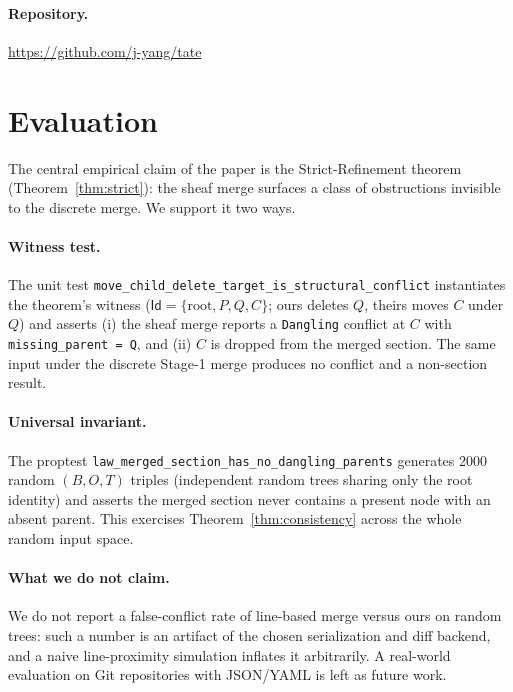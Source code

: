 \documentclass[11pt,a4paper]{article}
\newcommand{\Id}{\mathsf{Id}}
\begin{document}
\paragraph{Repository.} \url{https://github.com/j-yang/tate}


\section{Evaluation}
\label{sec:eval}

The central empirical claim of the paper is the Strict-Refinement theorem
(Theorem~\ref{thm:strict}): the sheaf merge surfaces a class of
obstructions invisible to the discrete merge. We support it two ways.

\paragraph{Witness test.} The unit test
\texttt{move\_child\_delete\_target\_is\_structural\_conflict}
instantiates the theorem's witness ($\Id = \{\text{root}, P, Q, C\}$; ours
deletes $Q$, theirs moves $C$ under $Q$) and asserts (i) the sheaf merge
reports a \texttt{Dangling} conflict at $C$ with \texttt{missing\_parent = Q},
and (ii) $C$ is dropped from the merged section. The same input under the
discrete Stage-1 merge produces no conflict and a non-section result.

\paragraph{Universal invariant.} The proptest
\texttt{law\_merged\_section\_has\_no\_dangling\_parents} generates 2000
random $(B, O, T)$ triples (independent random trees sharing only the
root identity) and asserts the merged section never contains a present
node with an absent parent. This exercises Theorem~\ref{thm:consistency}
across the whole random input space.

\paragraph{What we do not claim.} We do not report a false-conflict rate
of line-based merge versus ours on random trees: such a number is an
artifact of the chosen serialization and diff backend, and a naive
line-proximity simulation inflates it arbitrarily. A real-world
evaluation on Git repositories with JSON/YAML is left as future work.
\end{document}
